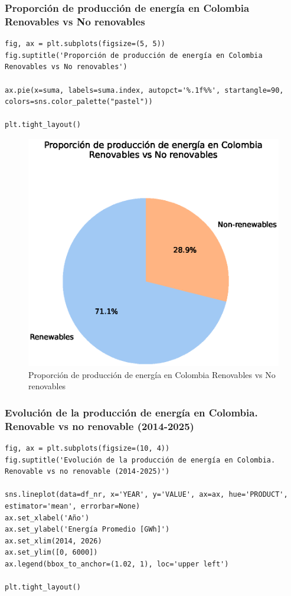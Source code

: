 \documentclass{article}
\begin{document}
\subsubsection{Proporción de producción de energía en Colombia Renovables vs No renovables}

\begin{verbatim}
fig, ax = plt.subplots(figsize=(5, 5))
fig.suptitle('Proporción de producción de energía en Colombia Renovables vs No renovables')

ax.pie(x=suma, labels=suma.index, autopct='%.1f%%', startangle=90, colors=sns.color_palette("pastel"))

plt.tight_layout()	
\end{verbatim}

\begin{figure}[t]
	\centering
	\includegraphics[width=0.7\linewidth]{fig_10}
	\caption{Proporción de producción de energía en Colombia Renovables vs No renovables}
	\label{fig:fig10}
\end{figure}

\subsubsection{Evolución de la producción de energía en Colombia. Renovable vs no renovable (2014-2025)}

\begin{verbatim}
fig, ax = plt.subplots(figsize=(10, 4))
fig.suptitle('Evolución de la producción de energía en Colombia. Renovable vs no renovable (2014-2025)')

sns.lineplot(data=df_nr, x='YEAR', y='VALUE', ax=ax, hue='PRODUCT', estimator='mean', errorbar=None)
ax.set_xlabel('Año')
ax.set_ylabel('Energía Promedio [GWh]')
ax.set_xlim(2014, 2026)
ax.set_ylim([0, 6000])
ax.legend(bbox_to_anchor=(1.02, 1), loc='upper left')

plt.tight_layout()	
\end{verbatim}
\end{document}
